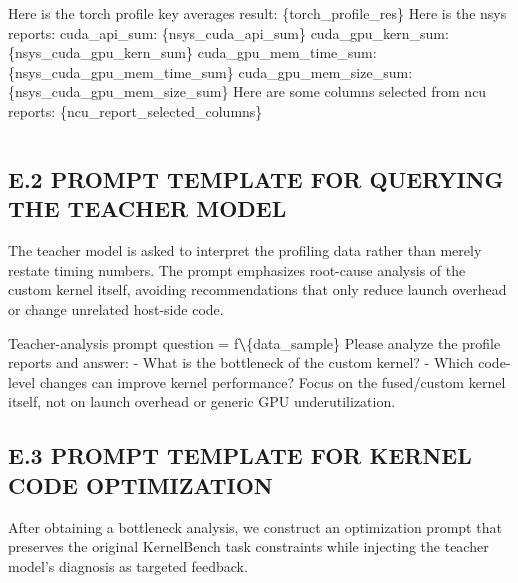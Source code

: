 \documentclass[
  10
]{article}
\newenvironment{Shaded}{}{}
\newcommand{\ErrorTok}[1]{\textcolor[rgb]{1.00,0.00,0.00}{\textbf{#1}}}
\newcommand{\NormalTok}[1]{#1}
\newcommand{\OperatorTok}[1]{\textcolor[rgb]{0.40,0.40,0.40}{#1}}
\newcommand{\SpecialCharTok}[1]{\textcolor[rgb]{0.25,0.44,0.63}{#1}}
\newcommand{\SpecialStringTok}[1]{\textcolor[rgb]{0.73,0.40,0.53}{#1}}
\begin{document}
Here is the torch profile key averages result: \{torch\_profile\_res\}
Here is the nsys reports: cuda\_api\_sum: \{nsys\_cuda\_api\_sum\}
cuda\_gpu\_kern\_sum: \{nsys\_cuda\_gpu\_kern\_sum\}
cuda\_gpu\_mem\_time\_sum: \{nsys\_cuda\_gpu\_mem\_time\_sum\}
cuda\_gpu\_mem\_size\_sum: \{nsys\_cuda\_gpu\_mem\_size\_sum\} Here are
some columns selected from ncu reports:
\{ncu\_report\_selected\_columns\}

\begin{verbatim}
\end{verbatim}

\subsection{E.2 PROMPT TEMPLATE FOR QUERYING THE TEACHER
MODEL}\label{e.2-prompt-template-for-querying-the-teacher-model}

The teacher model is asked to interpret the profiling data rather than
merely restate timing numbers. The prompt emphasizes root-cause analysis
of the custom kernel itself, avoiding recommendations that only reduce
launch overhead or change unrelated host-side code.

\begin{Shaded}
\begin{Highlighting}[]
\NormalTok{Teacher}\OperatorTok{{-}}\NormalTok{analysis prompt}
\NormalTok{question }\OperatorTok{=} \SpecialStringTok{f\textquotesingle{}\textquotesingle{}\textquotesingle{}}\ErrorTok{\textbackslash{}}\SpecialCharTok{\{}\NormalTok{data\_sample}\SpecialCharTok{\}}
\SpecialStringTok{Please analyze the profile reports and answer:}
\SpecialStringTok{{-} What is the bottleneck of the custom kernel?}
\SpecialStringTok{{-} Which code{-}level changes can improve kernel performance?}
\SpecialStringTok{Focus on the fused/custom kernel itself, not on launch overhead or generic GPU underutilization.}
\SpecialStringTok{\textquotesingle{}\textquotesingle{}\textquotesingle{}} 
\end{Highlighting}
\end{Shaded}

\subsection{E.3 PROMPT TEMPLATE FOR KERNEL CODE
OPTIMIZATION}\label{e.3-prompt-template-for-kernel-code-optimization}

After obtaining a bottleneck analysis, we construct an optimization
prompt that preserves the original KernelBench task constraints while
injecting the teacher model's diagnosis as targeted feedback.
\end{document}
